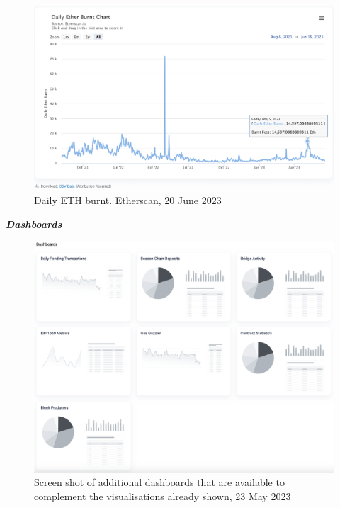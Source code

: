 \documentclass[UTF8]{article}
\begin{document}
\begin{figure}[htbp]
\begin{center}
\includegraphics[width=0.9\linewidth]{images/ethburnt}
\caption{Daily ETH burnt. Etherscan, 20 June 2023}
\label{fig:ethburnt}
\end{center}
\end{figure}

\clearpage
\textit{\textbf{Dashboards}}
\begin{figure}[htbp]
\begin{center}
\includegraphics[width=0.9\linewidth]{images/dashboards}
\caption{Screen shot of additional dashboards that are available to complement the visualisations already shown, 23 May 2023}
\label{fig:dashboards}
\end{center}
\end{figure}
\end{document}
